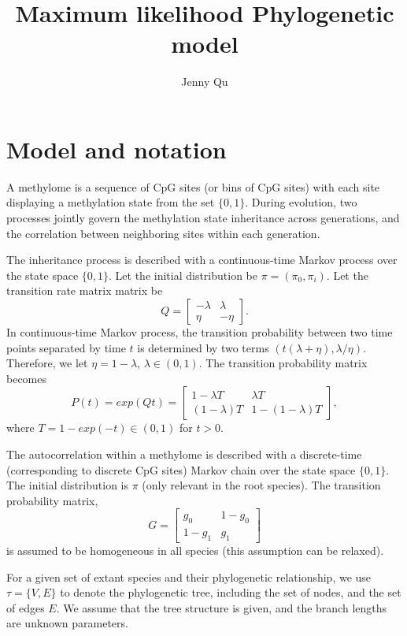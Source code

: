 \documentclass[11pt]{article}
\title{Maximum likelihood Phylogenetic model}
\author{Jenny Qu}
\begin{document}
\maketitle
\section{Model and notation}

A methylome is a sequence of CpG sites (or bins of CpG sites) with
each site displaying a methylation state from the set
$\{0,1\}$. During evolution, two processes jointly govern the methylation
state inheritance across generations, and the correlation between neighboring
sites within each generation.

The inheritance process is described with a continuous-time Markov
process over the state space $\{0,1\}$. Let the initial distribution
be $\pi=(\pi_0, \pi_i)$. Let the transition rate matrix matrix be
$$Q=\begin{bmatrix}
      -\lambda  & \lambda  \\[0.3em]
      \eta & -\eta
    \end{bmatrix}.
$$
In continuous-time Markov process, the transition probability between
two time points separated by time $t$ is determined by two terms
$(t(\lambda+\eta), \lambda/\eta)$. Therefore, we let $\eta =
1-\lambda$, $\lambda\in(0,1)$. The transition probability matrix becomes
$$P(t) = exp(Qt) = \begin{bmatrix}
      1-\lambda T & \lambda T \\[0.3em]
      (1-\lambda)T & 1-(1-\lambda)T
    \end{bmatrix},$$
where $T = 1-exp(-t) \in(0,1)$ for $t>0$.

The autocorrelation within a methylome is described with a
discrete-time (corresponding to discrete CpG sites) Markov chain over
the state space $\{0,1\}$. The initial distribution is $\pi$ (only
relevant in the root species). The transition probability matrix,
$$G=\begin{bmatrix}
      g_0  & 1-g_0  \\[0.3em]
      1-g_1 & g_1
    \end{bmatrix}
$$
is assumed to be homogeneous in all species (this assumption can be
relaxed).

For a given set of extant species and their phylogenetic relationship,
we use $\tau=\{V, E\}$ to denote the phylogenetic tree, including the
set of nodes, and the set of edges $E$. We assume that the tree
structure is given, and the branch lengths are unknown parameters.
\end{document}
